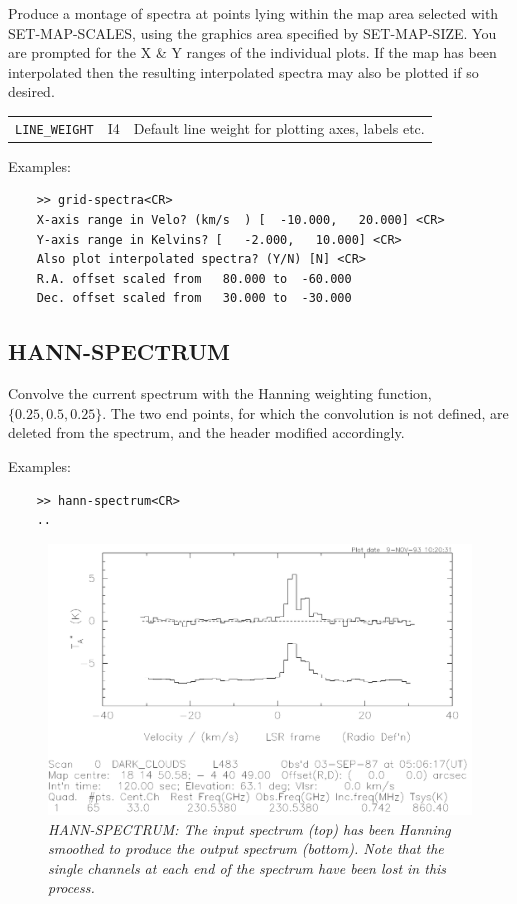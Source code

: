 \documentclass[11pt,twoside]{report}
\begin{document}
Produce a montage of spectra at points lying within the map area selected
with SET-MAP-SCALES, using the graphics area specified by SET-MAP-SIZE.
You are prompted for the X \& Y ranges of the individual plots. If the
map has been interpolated then the resulting interpolated spectra may also
be plotted if so desired.

\begin{tabular}{lll}
  \verb+LINE_WEIGHT+ & I4  & Default line weight for plotting axes,
                             labels etc.
\end{tabular}

Examples:
\begin{verbatim}
    >> grid-spectra<CR>
    X-axis range in Velo? (km/s  ) [  -10.000,   20.000] <CR>
    Y-axis range in Kelvins? [   -2.000,   10.000] <CR>
    Also plot interpolated spectra? (Y/N) [N] <CR>
    R.A. offset scaled from   80.000 to  -60.000
    Dec. offset scaled from   30.000 to  -30.000
\end{verbatim}

\subsection{HANN-SPECTRUM} 

Convolve the current spectrum with the Hanning weighting function,
$\{0.25,0.5,0.25\}$. The two end points, for which the convolution is not
defined, are deleted from the spectrum, and the header modified accordingly.

Examples:
\begin{verbatim}
    >> hann-spectrum<CR>
    ..
\end{verbatim}

\begin{figure}[htbp]
\begin{center}
\includegraphics[scale=0.65]{hann}
\protect\parbox{5.5in}
{\caption[HANN]
{\sl
HANN-SPECTRUM: The input spectrum (top) has been Hanning smoothed to produce
the output spectrum (bottom). Note that the single channels at each end of the
spectrum have been lost in this process.
\label{HANN}
}
}
\end{center}
\end{figure}
\end{document}
